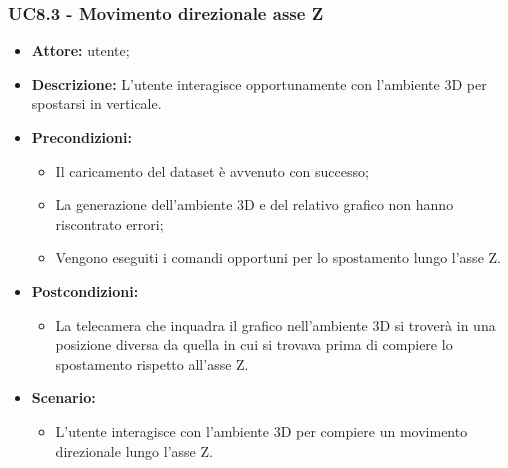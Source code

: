 \subsubsection{UC8.3 - Movimento direzionale asse Z}
\begin{itemize}    
    \item \textbf{Attore:} utente;
    \item \textbf{Descrizione:} L'utente interagisce opportunamente con l'ambiente 3D per spostarsi in verticale.
    \item \textbf{Precondizioni:}    
        \begin{itemize}
            \item Il caricamento del dataset è avvenuto con successo;
            \item La generazione dell'ambiente 3D e del relativo grafico non hanno riscontrato errori;
            \item Vengono eseguiti i comandi opportuni per lo spostamento lungo l'asse Z.
        \end{itemize}    
    \item \textbf{Postcondizioni:}
        \begin{itemize}
            \item La telecamera che inquadra il grafico nell'ambiente 3D si troverà in una posizione diversa da quella in cui si trovava prima di compiere lo spostamento rispetto all'asse Z.
        \end{itemize}    
    \item \textbf{Scenario:} 
        \begin{itemize}
            \item L'utente interagisce con l'ambiente 3D per compiere un movimento direzionale lungo l'asse Z.
        \end{itemize}
\end{itemize}

